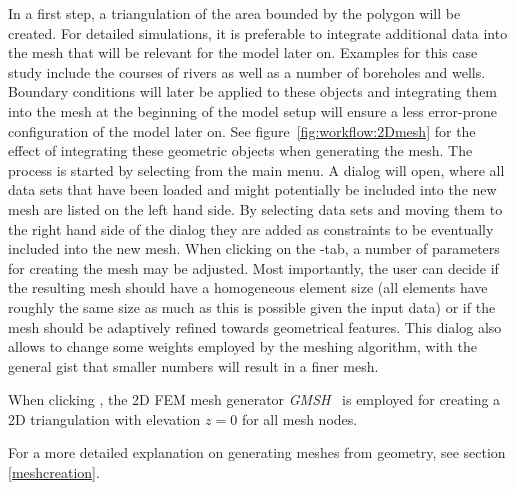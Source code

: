 In a first step, a triangulation of the area bounded by the polygon will be created. For detailed simulations, it is preferable to integrate additional data into the mesh that will be relevant for the model later on. Examples for this case study include the courses of rivers as well as a number of boreholes and wells. Boundary conditions will later be applied to these objects and integrating them into the mesh at the beginning of the model setup will ensure a less error-prone configuration of the model later on. See figure~\ref{fig:workflow:2Dmesh} for the effect of integrating these geometric objects when generating the mesh.
The process is started by selecting  from the main menu. A dialog will open, where all data sets that have been loaded and might potentially be included into the new mesh are listed on the left hand side. By selecting data sets and moving them to the right hand side of the dialog they are added as constraints to be eventually included into the new mesh. When clicking on the -tab, a number of parameters for creating the mesh may be adjusted. Most importantly, the user can decide if the resulting mesh should have a homogeneous element size (all elements have roughly the same size as much as this is possible given the input data) or if the mesh should be adaptively refined towards geometrical features. This dialog also allows to change some weights employed by the meshing algorithm, with the general gist that smaller numbers will result in a finer mesh. 

When clicking , the 2D FEM mesh generator \emph{GMSH}~\cite{geuzaine:gmsh} is employed for creating
a 2D triangulation with elevation $z=0$ for all mesh nodes.

For a more detailed explanation on generating meshes from geometry, see section \ref{meshcreation}.


